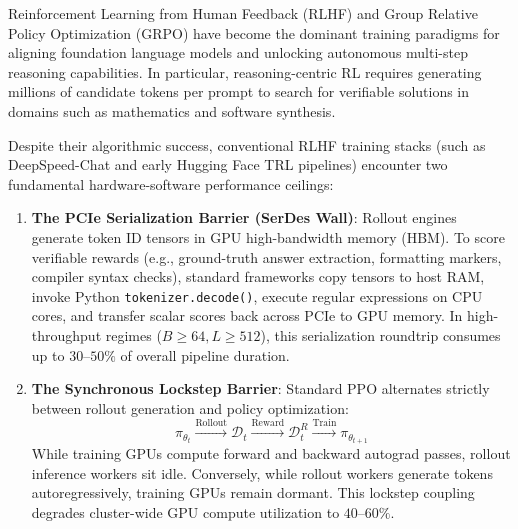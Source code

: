 \documentclass[10pt,twocolumn,letterpaper]{article}
\begin{document}
Reinforcement Learning from Human Feedback (RLHF) \cite{ouyang2022training, schulman2017proximal} and Group Relative Policy Optimization (GRPO) \cite{shao2024deepseekmath, deepseek2025r1} have become the dominant training paradigms for aligning foundation language models and unlocking autonomous multi-step reasoning capabilities. In particular, reasoning-centric RL requires generating millions of candidate tokens per prompt to search for verifiable solutions in domains such as mathematics and software synthesis.

Despite their algorithmic success, conventional RLHF training stacks (such as DeepSpeed-Chat and early Hugging Face TRL pipelines) encounter two fundamental hardware-software performance ceilings:

\begin{enumerate}
    \item \textbf{The PCIe Serialization Barrier (SerDes Wall)}: Rollout engines generate token ID tensors in GPU high-bandwidth memory (HBM). To score verifiable rewards (e.g., ground-truth answer extraction, formatting markers, compiler syntax checks), standard frameworks copy tensors to host RAM, invoke Python \texttt{tokenizer.decode()}, execute regular expressions on CPU cores, and transfer scalar scores back across PCIe to GPU memory. In high-throughput regimes ($B \ge 64, L \ge 512$), this serialization roundtrip consumes up to $30\text{--}50\%$ of overall pipeline duration.
    \item \textbf{The Synchronous Lockstep Barrier}: Standard PPO alternates strictly between rollout generation and policy optimization:
    \begin{equation*}
        \pi_{\theta_t} \xrightarrow{\text{Rollout}} \mathcal{D}_t \xrightarrow{\text{Reward}} \mathcal{D}_t^R \xrightarrow{\text{Train}} \pi_{\theta_{t+1}}
    \end{equation*}
    While training GPUs compute forward and backward autograd passes, rollout inference workers sit idle. Conversely, while rollout workers generate tokens autoregressively, training GPUs remain dormant. This lockstep coupling degrades cluster-wide GPU compute utilization to $40\text{--}60\%$.
\end{enumerate}
\end{document}
